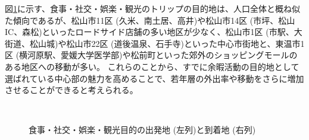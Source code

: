 \documentclass[a4paper,12pt, uplatex]{jsbook}
\begin{document}
図\ref{fig:od_leisure_young}に示す、食事・社交・娯楽・観光のトリップの目的地は、人口全体と概ね似た傾向であるが、松山市11区 (久米、南土居、高井)や松山市14区 (市坪、松山IC、森松)といったロードサイド店舗の多い地区が少なく、松山市1区 (市駅、大街道、松山城)や松山市22区 (道後温泉、石手寺)といった中心市街地と、東温市1区 (横河原駅、愛媛大学医学部)や松前町といった郊外のショッピングモールのある地区への移動が多い。
これらのことから、すでに余暇活動の目的地として選ばれている中心部の魅力を高めることで、若年層の外出率や移動をさらに増加させることができると考えられる。
%
\begin{figure}[htbp]
  \centering
  \\%
    \caption{食事・社交・娯楽・観光目的の出発地 (左列)と到着地 (右列)}
  	\label{fig:od_leisure_young}
\end{figure}
\end{document}
